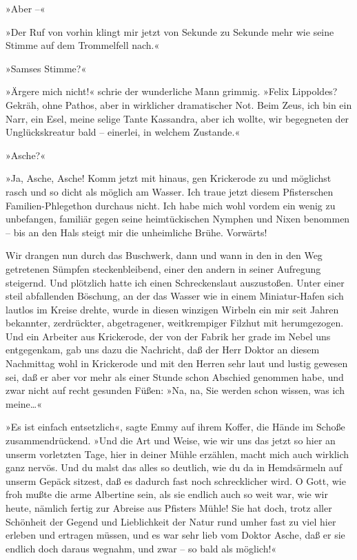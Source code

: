 »Aber –«

»Der Ruf von vorhin klingt mir jetzt von Sekunde zu Sekunde mehr
wie seine Stimme auf dem Trommelfell nach.«

»Samses Stimme?«

»Ärgere mich nicht!« schrie der wunderliche Mann grimmig. »Felix
Lippoldes? Gekräh, ohne Pathos, aber in wirklicher dramatischer
Not. Beim Zeus, ich bin ein Narr, ein Esel, meine selige Tante
Kassandra, aber ich wollte, wir begegneten der Unglückskreatur bald
– einerlei, in welchem Zustande.«

»Asche?«

»Ja, Asche, Asche! Komm jetzt mit hinaus, gen Krickerode zu und
möglichst rasch und so dicht als möglich am Wasser. Ich traue jetzt
diesem Pfisterschen Familien-Phlegethon durchaus nicht. Ich habe
mich wohl vordem ein wenig zu unbefangen, familiär gegen seine
heimtückischen Nymphen und Nixen benommen – bis an den Hals steigt
mir die unheimliche Brühe. Vorwärts!

Wir drangen nun durch das Buschwerk, dann und wann in den in den
Weg getretenen Sümpfen steckenbleibend, einer den andern in seiner
Aufregung steigernd. Und plötzlich hatte ich einen Schreckenslaut
auszustoßen. Unter einer steil abfallenden Böschung, an der das
Wasser wie in einem Miniatur-Hafen sich lautlos im Kreise drehte,
wurde in diesen winzigen Wirbeln ein mir seit Jahren bekannter,
zerdrückter, abgetragener, weitkrempiger Filzhut mit herumgezogen.
Und ein Arbeiter aus Krickerode, der von der Fabrik her grade im
Nebel uns entgegenkam, gab uns dazu die Nachricht, daß der Herr
Doktor an diesem Nachmittag wohl in Krickerode und mit den Herren
sehr laut und lustig gewesen sei, daß er aber vor mehr als einer
Stunde schon Abschied genommen habe, und zwar nicht auf recht
gesunden Füßen: »Na, na, Sie werden schon wissen, was ich
meine\ldots{}«

»Es ist einfach entsetzlich«, sagte Emmy auf ihrem Koffer, die
Hände im Schoße zusammendrückend. »Und die Art und Weise, wie wir
uns das jetzt so hier an unserm vorletzten Tage, hier in deiner
Mühle erzählen, macht mich auch wirklich ganz nervös. Und du malst
das alles so deutlich, wie du da in Hemdsärmeln auf unserm Gepäck
sitzest, daß es dadurch fast noch schrecklicher wird. O Gott, wie
froh mußte die arme Albertine sein, als sie endlich auch so weit
war, wie wir heute, nämlich fertig zur Abreise aus Pfisters Mühle!
Sie hat doch, trotz aller Schönheit der Gegend und Lieblichkeit der
Natur rund umher fast zu viel hier erleben und ertragen müssen, und
es war sehr lieb vom Doktor Asche, daß er sie endlich doch daraus
wegnahm, und zwar – so bald als möglich!«

